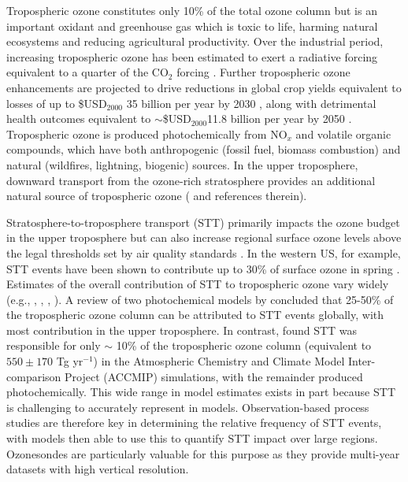 
Tropospheric ozone constitutes only 10\% of the total ozone column but is an important oxidant and greenhouse gas which is toxic to life, harming natural ecosystems and reducing agricultural productivity.
Over the industrial period, increasing tropospheric ozone has been estimated to exert a radiative forcing equivalent to a quarter of the CO$_2$ forcing \citep{IPCC_Chapter2}. 
Further tropospheric ozone enhancements are projected to drive reductions in global crop yields equivalent to losses of up to \$USD$_{2000}$ 35 billion per year by 2030 \citep{Avnery2011}, along with detrimental health outcomes equivalent to $\sim$\$USD$_{2000}$11.8 billion per year by 2050 \citep{Selin2009}.
Tropospheric ozone is produced photochemically from NO$_x$ and volatile organic compounds, which have both anthropogenic (fossil fuel, biomass combustion) and natural (wildfires, lightning, biogenic) sources.
In the upper troposphere, downward transport from the ozone-rich stratosphere provides an additional natural source of tropospheric ozone (\citet{Jacobson2000} and references therein). 

Stratosphere-to-troposphere transport (STT) primarily impacts the ozone budget in the upper troposphere but can also increase regional surface ozone levels above the legal thresholds set by air quality standards \citep{Danielson1968, Lefohn2011, Langford2012, Zhang2014}.
In the western US, for example, STT events have been shown to contribute up to 30\% of surface ozone in spring \citep{Lin2012}.
Estimates of the overall contribution of STT to tropospheric ozone vary widely (e.g., \citep{Galani2003},  \citet{Stohl2003}, \citet{Stevenson2006}, \citet{Lefohn2011}).
A review of two photochemical models by \citet{Stohl2003} concluded that 25-50\% of the tropospheric ozone column can be attributed to STT events globally, with most contribution in the upper troposphere.
In contrast, \citet{Stevenson2006} found STT was responsible for only $\sim$ 10\% of the tropospheric ozone column (equivalent to $550\pm170$ Tg yr$^{-1}$) in the Atmospheric Chemistry and Climate Model Inter-comparison Project (ACCMIP) simulations, with the remainder produced photochemically.
This wide range in model estimates exists in part because STT is challenging to accurately represent in models.
Observation-based process studies are therefore key in determining the relative frequency of STT events, with models then able to use this to quantify STT impact over large regions.
Ozonesondes are particularly valuable for this purpose as they provide multi-year datasets with high vertical resolution.

